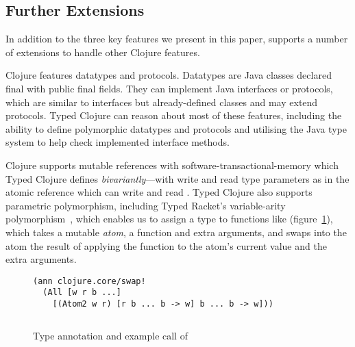 \subsection{Further Extensions}

In addition to the three key features we present in this paper,
\coretyped{} supports a number of extensions to handle other Clojure
features. 

Clojure features datatypes and protocols. Datatypes are Java classes
declared final with public final fields. They can implement Java interfaces
or protocols, which are similar to interfaces but already-defined classes
and \nil{} may extend protocols.
%
Typed Clojure can reason about most of these features,
including the ability to define polymorphic datatypes and protocols and
utilising the Java type system to help check implemented interface methods.

%
%
Clojure supports mutable references with software-transactional-memory
which Typed Clojure defines \emph{bivariantly}---with write and read type parameters
as in the atomic reference  which can write and read .
Typed Clojure also supports parametric polymorphism, including
Typed Racket's variable-arity polymorphism~\cite{stf-esop}, 
which enables us to assign a type to functions like  (figure~\ref{main:fig:swap!}),
which takes a mutable \emph{atom},
a function and extra arguments, and swaps into the atom the result of
applying the function to the atom's current value and the extra arguments.

\begin{figure}
\begin{verbatim}
(ann clojure.core/swap! 
  (All [w r b ...] 
    [(Atom2 w r) [r b ... b -> w] b ... b -> w]))

\end{verbatim}
\inputminted[firstline=5,lastline=5]{clojure}{code/demo/src/demo/atom.clj}
\caption{Type annotation and example call of }
\label{main:fig:swap!}
\end{figure}

